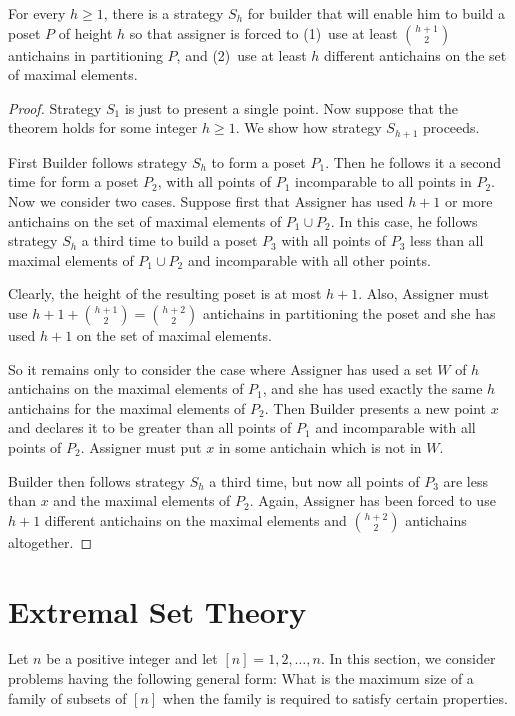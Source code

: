 \begin{theorem} 
For every $h\ge1$, there is a strategy $S_h$ for builder
that will enable him to build a poset $P$ of height $h$ so
that assigner is forced to (1)~use at least $\binom{h+1}{2}$
antichains in partitioning $P$, and (2)~use at least $h$
different antichains on the set of maximal elements.
\end{theorem}

\begin{proof}
Strategy $S_1$ is just to present a single point.
Now suppose that the theorem holds for some integer $h\ge1$.
We show how strategy $S_{h+1}$ proceeds.

First Builder follows strategy $S_h$ to form a poset $P_1$.
Then he follows it a second time for form a poset $P_2$, with
all points of $P_1$ incomparable to all points in $P_2$.
Now we consider two cases.  Suppose first that Assigner
has used $h+1$ or more antichains on the set of maximal elements of
$P_1\cup P_2$.  In this case, he follows strategy $S_h$
a third time to build a poset $P_3$ with all points of
$P_3$ less than all maximal elements of $P_1\cup P_2$
and incomparable with all other points.

Clearly, the height of the resulting poset is at most $h+1$.
Also, Assigner must use $h+1+\binom{h+1}{2}=\binom{h+2}{2}$
antichains in partitioning the poset and she has used $h+1$ on
the set of maximal elements.

So it remains only to consider the case where Assigner has used
a set $W$ of $h$ antichains on the maximal elements of $P_1$, and
she has used exactly the same $h$ antichains for the maximal elements
of $P_2$.  Then Builder presents a new point $x$
and declares it to be greater than all points of $P_1$ and
incomparable with all points of $P_2$.  Assigner must put $x$
in some antichain which is not in $W$.

Builder then follows strategy $S_h$ a third time, but
now all points of $P_3$ are less than $x$ and the maximal elements
of $P_2$.   Again, Assigner has been forced to use $h+1$ different
antichains on the maximal elements and $\binom{h+2}{2}$
antichains altogether.
\end{proof}

\section{Extremal Set Theory}\label{s:kitchensink:extremal-set-theory}

Let $n$ be a positive integer and let $[n]=1,2,\dots,n$.  In this
section, we consider problems having the following general form:
What is the maximum size of a family of subsets of $[n]$ when the
family is required to satisfy certain properties.

